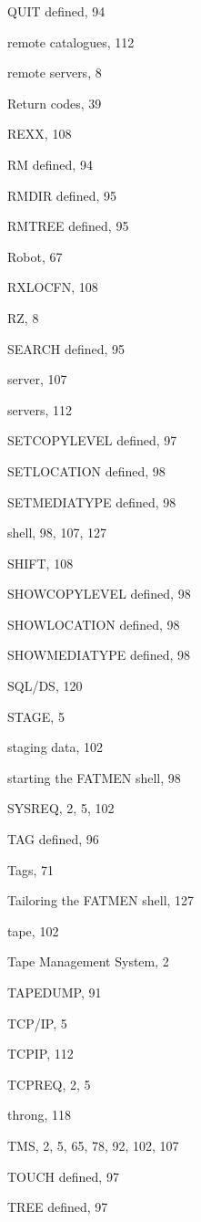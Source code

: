 \begin{theindex}
  \indexspace

  \item QUIT
    \subitem defined, 94

  \indexspace

  \item remote catalogues, 112
  \item remote servers, 8
  \item Return codes, 39
  \item REXX, 108
  \item RM
    \subitem defined, 94
  \item RMDIR
    \subitem defined, 95
  \item RMTREE
    \subitem defined, 95
  \item Robot, 67
  \item RXLOCFN, 108
  \item RZ, 8

  \indexspace

  \item SEARCH
    \subitem defined, 95
  \item server, 107
  \item servers, 112
  \item SETCOPYLEVEL
    \subitem defined, 97
  \item SETLOCATION
    \subitem defined, 98
  \item SETMEDIATYPE
    \subitem defined, 98
  \item shell, 98, 107, 127
  \item SHIFT, 108
  \item SHOWCOPYLEVEL
    \subitem defined, 98
  \item SHOWLOCATION
    \subitem defined, 98
  \item SHOWMEDIATYPE
    \subitem defined, 98
  \item SQL/DS, 120
  \item STAGE, 5
  \item staging data, 102
  \item starting the FATMEN shell, 98
  \item SYSREQ, 2, 5, 102

  \indexspace

  \item TAG
    \subitem defined, 96
  \item Tags, 71
  \item Tailoring the FATMEN shell, 127
  \item tape, 102
  \item Tape Management System, 2
  \item TAPEDUMP, 91
  \item TCP/IP, 5
  \item TCPIP, 112
  \item TCPREQ, 2, 5
  \item throng, 118
  \item TMS, 2, 5, 65, 78, 92, 102, 107
  \item TOUCH
    \subitem defined, 97
  \item TREE
    \subitem defined, 97


\end{theindex}
